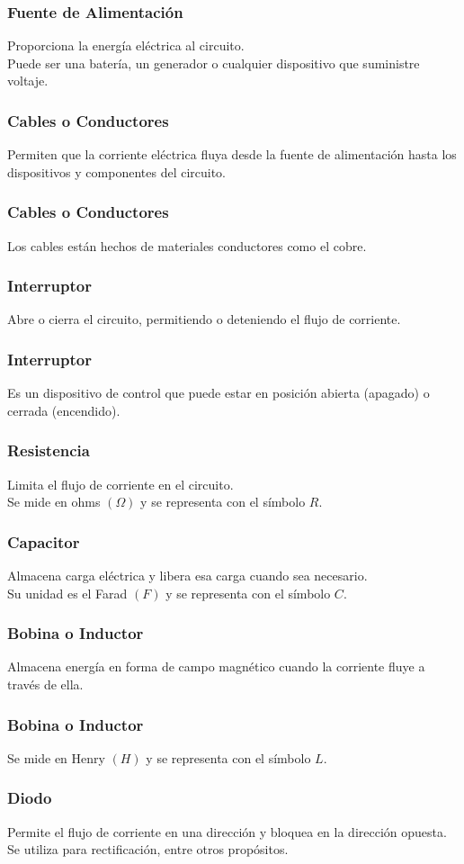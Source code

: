 \documentclass[14pt]{beamer}
\begin{document}
\begin{frame}
\frametitle{Fuente de Alimentación}
Proporciona la energía eléctrica al circuito.
\\
\bigskip
\pause
Puede ser una batería, un generador o cualquier dispositivo que suministre voltaje.
\end{frame}
\begin{frame}
\frametitle{Cables o Conductores}
Permiten que la corriente eléctrica fluya desde la fuente de alimentación hasta los dispositivos y componentes del circuito.
\end{frame}
\begin{frame}
\frametitle{Cables o Conductores}    
Los cables están hechos de materiales conductores como el cobre.
\end{frame}
\begin{frame}
\frametitle{Interruptor}
Abre o cierra el circuito, permitiendo o deteniendo el flujo de corriente.
\end{frame}
\begin{frame}
\frametitle{Interruptor}
Es un dispositivo de control que puede estar en posición abierta (apagado) o cerrada (encendido).
\end{frame}
\begin{frame}
\frametitle{Resistencia}
Limita el flujo de corriente en el circuito.
\\
\bigskip
\pause
Se mide en ohms $(\Omega)$ y se representa con el símbolo $R$.
\end{frame}
\begin{frame}
\frametitle{Capacitor}
Almacena carga eléctrica y libera esa carga cuando sea necesario.
\\
\bigskip
\pause
Su unidad es el Farad $(F)$ y se representa con el símbolo $C$.
\end{frame}
\begin{frame}
\frametitle{Bobina o Inductor}
Almacena energía en forma de campo magnético cuando la corriente fluye a través de ella.
\end{frame}
\begin{frame}
\frametitle{Bobina o Inductor}
Se mide en Henry $(H)$ y se representa con el símbolo $L$.
\end{frame}
\begin{frame}
\frametitle{Diodo}
Permite el flujo de corriente en una dirección \pause y bloquea en la dirección opuesta.
\\
\bigskip
\pause
Se utiliza para rectificación, entre otros propósitos.
\end{frame}
\end{document}
